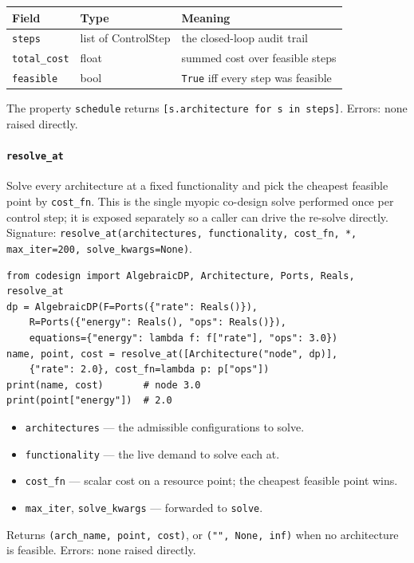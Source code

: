 \documentclass[11pt,a4paper]{article}
\begin{document}
\begin{center}
\begin{tabular}{@{}llp{}@{}}
\toprule
Field & Type & Meaning \\
\midrule
\texttt{steps} & list of ControlStep & the closed-loop audit trail \\
\texttt{total\_cost} & float & summed cost over feasible steps \\
\texttt{feasible} & bool & \texttt{True} iff every step was feasible \\
\bottomrule
\end{tabular}
\end{center}
The property \texttt{schedule} returns \texttt{[s.architecture for s in
steps]}. Errors: none raised directly.

\paragraph{\texttt{resolve\_at}}\label{ref:online_codesign:resolve_at}
Solve every architecture at a fixed functionality and pick the cheapest
feasible point by \texttt{cost\_fn}. This is the single myopic co-design
solve performed once per control step; it is exposed separately so a caller
can drive the re-solve directly. Signature: \texttt{resolve\_at(architectures,
functionality, cost\_fn, *, max\_iter=200, solve\_kwargs=None)}.

\begin{lstlisting}
from codesign import AlgebraicDP, Architecture, Ports, Reals, resolve_at
dp = AlgebraicDP(F=Ports({"rate": Reals()}),
    R=Ports({"energy": Reals(), "ops": Reals()}),
    equations={"energy": lambda f: f["rate"], "ops": 3.0})
name, point, cost = resolve_at([Architecture("node", dp)],
    {"rate": 2.0}, cost_fn=lambda p: p["ops"])
print(name, cost)       # node 3.0
print(point["energy"])  # 2.0
\end{lstlisting}

\begin{itemize}[nosep]
  \item \texttt{architectures} --- the admissible configurations to solve.
  \item \texttt{functionality} --- the live demand to solve each at.
  \item \texttt{cost\_fn} --- scalar cost on a resource point; the cheapest
    feasible point wins.
  \item \texttt{max\_iter}, \texttt{solve\_kwargs} --- forwarded to
    \texttt{solve}.
\end{itemize}
Returns \texttt{(arch\_name, point, cost)}, or \texttt{("", None, inf)} when
no architecture is feasible. Errors: none raised directly.
\end{document}
